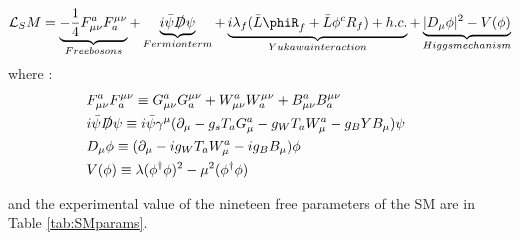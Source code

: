 \begin{equation}
    \Lagr_SM = \underbrace{- \frac{1}{4} F_{\mu\nu}^a F^{\mu\nu}_a}_{Free bosons} + \underbrace{i\Bar{\psi}\slashed{D}\psi}_{Fermion term} +\underbrace{i\lambda_f(\Bar{L}\phiR_f + \Bar{L}\phi^cR_f) + h.c.}_{Yukawa interaction} + \underbrace{|D_{\mu}\phi|^2 - V(\phi)}_{Higgs mechanism}
\end{equation}
where :
\begin{align*}
    & F_{\mu\nu}^a F^{\mu\nu}_a \equiv G_{\mu\nu}^a G^{\mu\nu}_a + W_{\mu\nu}^a W^{\mu\nu}_a + B_{\mu\nu}^a B^{\mu\nu}_a \\
    & i\Bar{\psi}\slashed{D}\psi \equiv i\Bar{\psi}\gamma^{\mu} (\partial_{\mu} - g_s T_a G_{\mu}^a - g_W T_a W^{a}_{\mu} - g_B Y B_{\mu})  \psi \\
    & D_{\mu}\phi \equiv (\partial_{\mu} - ig_W T_a W_{\mu}^{a} - ig_B B_{\mu})\phi \\
    & V(\phi) \equiv \lambda(\phi^{\dagger}\phi)^2 - \mu^2 (\phi^{\dagger}\phi) &&
\end{align*}

and the experimental value of the nineteen free parameters of the SM are in Table \ref{tab:SMparams}.

